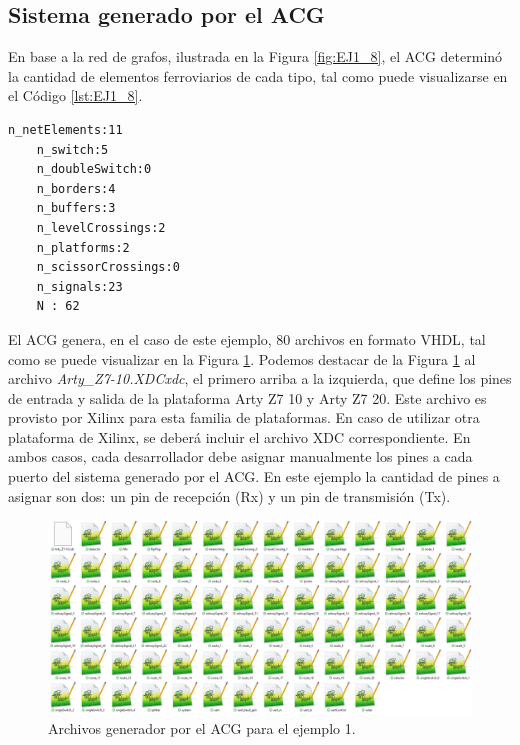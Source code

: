 \subsection{Sistema generado por el ACG}
	\label{sec:EJEMPLO1_ACG}
	
	En base a la red de grafos, ilustrada en la Figura \ref{fig:EJ1_8}, el ACG determinó la cantidad de elementos ferroviarios de cada tipo, tal como puede visualizarse en el Código \ref{lst:EJ1_8}.
	
	\begin{lstlisting}[language = {}, caption = Cantidad de elementos a implementar por el ACG, label = {lst:EJ1_8}]
	n_netElements:11
	n_switch:5
	n_doubleSwitch:0
	n_borders:4
	n_buffers:3
	n_levelCrossings:2
	n_platforms:2
	n_scissorCrossings:0
	n_signals:23
	N : 62
	\end{lstlisting}
	
	El ACG genera, en el caso de este ejemplo, 80 archivos en formato VHDL, tal como se puede visualizar en la Figura \ref{fig:EJ1_ACG_1}. Podemos destacar de la Figura \ref{fig:EJ1_ACG_1} al archivo \textit{Arty\_Z7-10.XDCxdc}, el primero arriba a la izquierda, que define los pines de entrada y salida de la plataforma Arty Z7 10 y Arty Z7 20. Este archivo es provisto por Xilinx para esta familia de plataformas. En caso de utilizar otra plataforma de Xilinx, se deberá incluir el archivo XDC correspondiente. En ambos casos, cada desarrollador debe asignar manualmente los pines a cada puerto del sistema generado por el ACG. En este ejemplo la cantidad de pines a asignar son dos: un pin de recepción (Rx) y un pin de transmisión (Tx).
	
	\begin{figure}[H]
		\centering
		\includegraphics[origin = c, width=1\textwidth]{resultados-obtenidos/ejemplo1/images/ACG_files}
		\centering\caption{Archivos generador por el ACG para el ejemplo 1.}
		\label{fig:EJ1_ACG_1}
	\end{figure}
	

